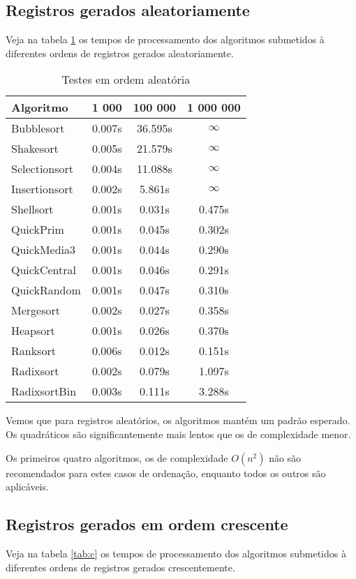 \documentclass[
	11pt,
	oneside,
	a4paper,
	english,
	brazil,
	]{article}
\begin{document}
\subsection{Registros gerados aleatoriamente}
Veja na tabela \ref{tab:a} os tempos de processamento dos algoritmos submetidos
à diferentes ordens de registros gerados aleatoriamente.

\begin{table}[ht]
\centering
\begin{tabular}{lccc}
\hline 
\textbf{Algoritmo} & \textbf{1 000} & \textbf{100 000} &  \textbf{1 000 000}  \\
\hline
Bubblesort   	& 0.007s & 36.595s  & $\infty$   \\
Shakesort  		& 0.005s & 21.579s  & $\infty$   \\
Selectionsort	& 0.004s & 11.088s  & $\infty$   \\
Insertionsort  	& 0.002s & 5.861s   & $\infty$   \\
Shellsort 		& 0.001s & 0.031s   & 0.475s     \\
QuickPrim		& 0.001s & 0.045s   & 0.302s     \\
QuickMedia3		& 0.001s & 0.044s   & 0.290s     \\
QuickCentral	& 0.001s & 0.046s   & 0.291s     \\
QuickRandom		& 0.001s & 0.047s   & 0.310s     \\
Mergesort 		& 0.002s & 0.027s   & 0.358s     \\
Heapsort 		& 0.001s & 0.026s   & 0.370s     \\
Ranksort 		& 0.006s & 0.012s   & 0.151s     \\
Radixsort 		& 0.002s & 0.079s   & 1.097s     \\
RadixsortBin 	& 0.003s & 0.111s   & 3.288s     \\
\hline
\end{tabular}
\caption{Testes em ordem aleatória}
\label{tab:a}
\end{table}

Vemos que para registros aleatórios, os algoritmos mantém um padrão
esperado. Os quadráticos são significantemente mais lentos que os de 
complexidade menor.

Os primeiros quatro algoritmos, os de complexidade $O(n^2)$ não são
recomendados para estes casos de ordenação, enquanto todos os outros
são aplicáveis.

\subsection{Registros gerados em ordem crescente}
Veja na tabela \ref{tab:c} os tempos de processamento dos algoritmos submetidos
à diferentes ordens de registros gerados crescentemente.
\end{document}
